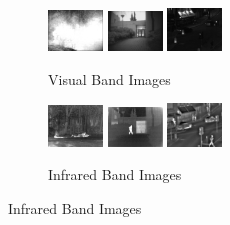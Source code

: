 \begin{figure}[htbp]
    \centering
    \begin{subfigure}[b]{\textwidth}
        \includegraphics[width=0.16\textwidth, height=0.1\textheight]{imgs/ch5/vis/20.png}
        \includegraphics[width=0.16\textwidth, height=0.1\textheight]{imgs/ch5/vis/12.png}
        \includegraphics[width=0.16\textwidth, height=0.1\textheight]{imgs/ch5/vis/02.png}
        \captionsetup{justification=raggedright,singlelinecheck=false}
        \caption{Visual Band Images}
        \label{fig:ch5:met2:vis}
    \end{subfigure}
    \vspace{0.01cm}
    \begin{subfigure}[b]{\textwidth}
        \includegraphics[width=0.16\textwidth, height=0.1\textheight]{imgs/ch5/ir/20.png}
        \includegraphics[width=0.16\textwidth, height=0.1\textheight]{imgs/ch5/ir/12.png}
        \includegraphics[width=0.16\textwidth, height=0.1\textheight]{imgs/ch5/ir/02.png}
        \captionsetup{justification=raggedright,singlelinecheck=false}
        \caption{Infrared Band Images}
        \label{fig:ch5:met2:ir}
    \end{subfigure}
    \vspace{0.01cm}

\end{figure}
